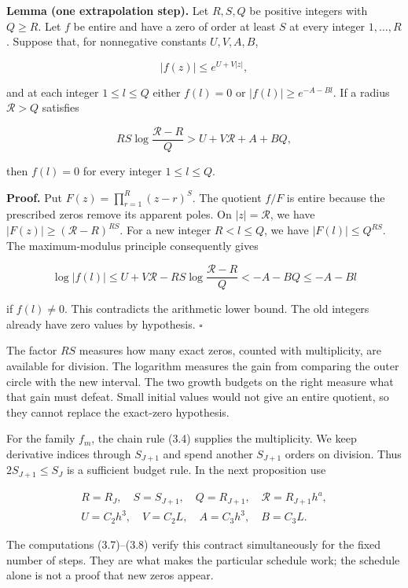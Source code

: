 \documentclass[
  11pt,
  a4paper,
]{article}
\begin{document}
\textbf{Lemma (one extrapolation step).} Let \(R,S,Q\) be positive
integers with \(Q\ge R\). Let \(f\) be entire and have a zero of order
at least \(S\) at every integer \(1,\ldots,R\). Suppose that, for
nonnegative constants \(U,V,A,B\),

\[
|f(z)|\le e^{U+V|z|},
\]

and at each integer \(1\le l\le Q\) either \(f(l)=0\) or
\(|f(l)|\ge e^{-A-Bl}\). If a radius \(\mathcal R>Q\) satisfies

\[
RS\log\frac{\mathcal R-R}{Q}
>U+V\mathcal R+A+BQ,
\]

then \(f(l)=0\) for every integer \(1\le l\le Q\).

\textbf{Proof.} Put \(F(z)=\prod_{r=1}^{R}(z-r)^S\). The quotient
\(f/F\) is entire because the prescribed zeros remove its apparent
poles. On \(|z|=\mathcal R\), we have \(|F(z)|\ge(\mathcal R-R)^{RS}\).
For a new integer \(R<l\le Q\), we have \(|F(l)|\le Q^{RS}\). The
maximum-modulus principle consequently gives

\[
\log|f(l)|\le U+V\mathcal R
-RS\log\frac{\mathcal R-R}{Q}
<-A-BQ\le-A-Bl
\]

if \(f(l)\ne0\). This contradicts the arithmetic lower bound. The old
integers already have zero values by hypothesis. \(\square\)

The factor \(RS\) measures how many exact zeros, counted with
multiplicity, are available for division. The logarithm measures the
gain from comparing the outer circle with the new interval. The two
growth budgets on the right measure what that gain must defeat. Small
initial values would not give an entire quotient, so they cannot replace
the exact-zero hypothesis.

For the family \(f_m\), the chain rule (3.4) supplies the multiplicity.
We keep derivative indices through \(S_{J+1}\) and spend another
\(S_{J+1}\) orders on division. Thus \(2S_{J+1}\le S_J\) is a sufficient
budget rule. In the next proposition use

\[
\begin{gathered}
R=R_J,\quad S=S_{J+1},\quad Q=R_{J+1},\quad
\mathcal R=R_{J+1}h^a,\\
U=C_2h^3,\quad V=C_2L,\quad
A=C_3h^3,\quad B=C_3L.
\end{gathered}
\]

The computations (3.7)--(3.8) verify this contract simultaneously for
the fixed number of steps. They are what makes the particular schedule
work; the schedule alone is not a proof that new zeros appear.
\end{document}
